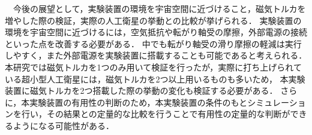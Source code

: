 　今後の展望として，実験装置の環境を宇宙空間に近づけること，磁気トルカを増やした際の検証，実際の人工衛星の挙動との比較が挙げられる．
実験装置の環境を宇宙空間に近づけるには，空気抵抗や転がり軸受の摩擦，外部電源の接続といった点を改善する必要がある．
中でも転がり軸受の滑り摩擦の軽減は実行しやすく，また外部電源を実験装置に搭載することも可能であると考えられる．
本研究では磁気トルカを1つのみ用いて検証を行ったが，実際に打ち上げられている超小型人工衛星には，磁気トルカを2つ以上用いるものも多いため，
本実験装置に磁気トルカを2つ搭載した際の挙動の変化も検証する必要がある．
さらに，本実験装置の有用性の判断のため，本実験装置の条件のもとシミュレーションを行い，その結果との定量的な比較を行うことで有用性の定量的な判断ができるようになる可能性がある．

